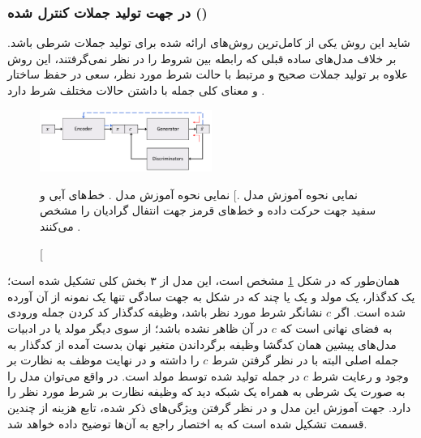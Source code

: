 \subsubsection{
    در جهت تولید جملات کنترل شده
    (\lr{\towardctg{}})\protect{}}
شاید این روش یکی از کامل‌ترین روش‌های ارائه شده برای تولید جملات شرطی باشد. بر خلاف مدل‌های ساده قبلی که رابطه بین شروط را در نظر نمی‌گرفتند، این روش علاوه بر تولید جملات صحیح و مرتبط با حالت شرط مورد نظر، سعی در حفظ ساختار و معنای کلی جمله با داشتن حالات مختلف شرط دارد \cite{toward}.
\begin{figure}[h]
    \centering
    \includegraphics[width=0.5\textwidth]{images/toward1.png}
    \caption
    [نمایی نحوه آموزش مدل \towardctg.]
    {
        نمایی نحوه آموزش مدل \towardctg. خط‌های آبی و سفید جهت حرکت داده و خط‌های قرمز جهت انتفال گرادیان را مشخص می‌کنند \cite{toward}.}
    \label{fig:toward}
\end{figure}
همان‌طور که در شکل \ref{fig:toward} مشخص است، این مدل از ۳ بخش کلی تشکیل شده است؛ یک کدگذار، یک مولد و یک یا چند \discriminator{} که در شکل به جهت سادگی تنها یک نمونه از آن آورده شده است. اگر $c$ نشانگر شرط مورد نظر باشد، وظیفه کدگذار کد کردن جمله ورودی به فضای نهانی است که $c$ در آن ظاهر نشده باشد؛ از سوی دیگر مولد یا در ادبیات مدل‌های پیشین همان کدگشا وظیفه برگرداندن متغیر نهان بدست آمده از کدگذار به جمله اصلی البته با در نظر گرفتن شرط $c$ را داشته و در نهایت \discriminator{} موظف به نظارت بر وجود و رعایت شرط $c$ در جمله تولید شده توسط مولد است. در واقع می‌توان مدل را به صورت یک \vae{} شرطی به همراه یک شبکه \discriminator{} دید که وظیفه نظارت بر شرط مورد نظر را دارد. جهت آموزش این مدل و در نظر گرفتن ویژگی‌های ذکر شده، تابع هزینه از چندین قسمت تشکیل شده است که به اختصار راجع به آن‌ها توضیح داده خواهد شد.
